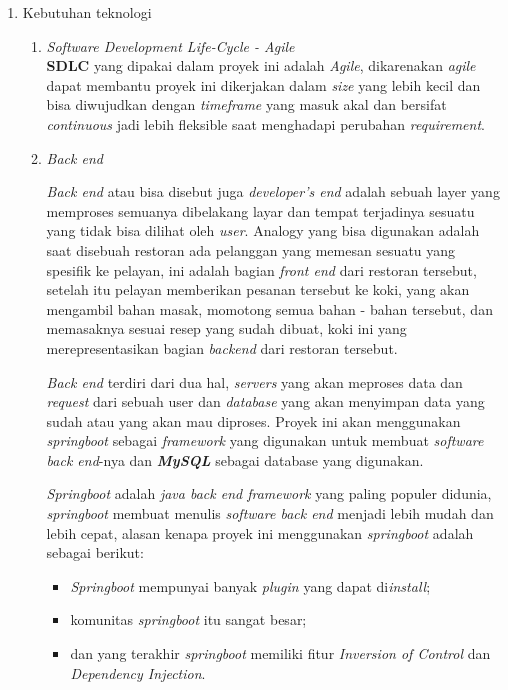\documentclass[a4paper]{article}
\begin{document}
\begin{enumerate}[label=\alph*. ]

    \item Kebutuhan teknologi

          \begin{enumerate}
              \item \textit{Software Development Life-Cycle - Agile}\\
                    \textbf{SDLC} yang dipakai dalam proyek ini adalah \textit{Agile}, dikarenakan \textit{agile} dapat membantu proyek ini dikerjakan dalam \textit{size} yang lebih kecil dan bisa diwujudkan dengan \textit{timeframe} yang masuk akal dan bersifat \textit{continuous} jadi lebih fleksible saat menghadapi perubahan \textit{requirement}\autocite{atlassian-agile}.

              \item \textit{Back end}

                    \textit{Back end} atau bisa disebut juga \textit{developer's end} adalah sebuah layer yang memproses semuanya dibelakang layar dan tempat terjadinya sesuatu yang tidak bisa dilihat oleh \textit{user}\autocite{letsgodojo-frontend-backend}. Analogy yang bisa digunakan adalah saat disebuah restoran ada pelanggan yang memesan sesuatu yang spesifik ke pelayan, ini adalah bagian \textit{front end} dari restoran tersebut, setelah itu pelayan memberikan pesanan tersebut ke koki, yang akan mengambil bahan masak, momotong semua bahan - bahan tersebut, dan memasaknya sesuai resep yang sudah dibuat, koki ini yang merepresentasikan bagian \textit{backend} dari restoran tersebut\autocite{codecademy-backend}.

                    \textit{Back end} terdiri dari dua hal, \textit{servers} yang akan meproses data dan \textit{request} dari sebuah user dan \textit{database} yang akan menyimpan data yang sudah atau yang akan mau diproses\autocite{codecademy-backend}. Proyek ini akan menggunakan \textit{springboot} sebagai \textit{framework} yang digunakan untuk membuat \textit{software back end}-nya dan \textit{\textbf{MySQL}} sebagai database yang digunakan.

                    \textit{Springboot} adalah \textit{java back end framework} yang paling populer didunia, \textit{springboot} membuat menulis \textit{software back end} menjadi lebih mudah dan lebih cepat\autocite{spring-framework}, alasan kenapa proyek ini menggunakan \textit{springboot} adalah sebagai berikut:
                    \begin{itemize}
                        \item \textit{Springboot} mempunyai banyak \textit{plugin} yang dapat di\textit{install};
                        \item komunitas \textit{springboot} itu sangat besar;
                        \item dan yang terakhir \textit{springboot} memiliki fitur \textit{Inversion of Control} dan \textit{Dependency Injection}.
                    \end{itemize}


\end{enumerate}
\end{enumerate}
\end{document}
